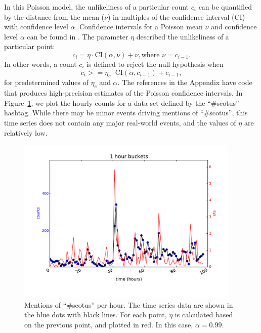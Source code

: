 \documentclass{article}
\begin{document}
In this Poisson model, the unlikeliness of a particular count $c_i$ can be
quantified by the distance from the mean ($\nu$) in multiples of the confidence 
interval (CI) with confidence level $\alpha$. Confidence intervals for a Poisson mean $\nu$ and
confidence level $\alpha$ can be found in \cite{George:2012}. 
The parameter $\eta$ described the unlikeliness of a particular point:
\begin{equation}
    c_i = \eta \cdot \textrm{CI}(\alpha, \nu) + \nu, \textrm{where } \nu = c_{i-1}.
\end{equation}
In other words, a count $c_i$ is defined to
reject the null hypothesis when
\begin{equation}
    c_i >= \eta_c \cdot \textrm{CI}(\alpha, c_{i-1}) + c_{i-1},
\end{equation}
for predetermined values of $\eta_c$ and $\alpha$. 
The references in
the Appendix have code that produces high-precision estimates of the
Poisson confidence intervals. In Figure~\ref{fig:scotus1}, we plot the hourly counts for a
data set defined by the ``\#scotus'' hashtag. While there may be minor events
driving mentions of ``\#scotus'', this time series does not contain any major
real-world events, and the values of $\eta$ are relatively low.

\begin{figure} 
\begin{center}
\includegraphics[width=0.95\textwidth]{fig/scotus_pbppm.pdf} \caption{Mentions
of ``\#scotus'' per hour. The time series data are shown in the blue dots with
black lines. For each point, $\eta$ is calculated based on the previous point, and
plotted in red. In this case, $\alpha=0.99$. }
\label{fig:scotus1}
\end{center}
\end{figure}
\end{document}
